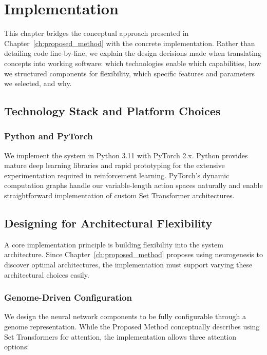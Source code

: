 \chapter{Implementation}
\label{ch:implementation}

This chapter bridges the conceptual approach presented in Chapter~\ref{ch:proposed_method} with the concrete implementation. Rather than detailing code line-by-line, we explain the design decisions made when translating concepts into working software: which technologies enable which capabilities, how we structured components for flexibility, which specific features and parameters we selected, and why.

\section{Technology Stack and Platform Choices}

\subsection{Python and PyTorch}

We implement the system in Python 3.11 with PyTorch 2.x. Python provides mature deep learning libraries and rapid prototyping for the extensive experimentation required in reinforcement learning. PyTorch's dynamic computation graphs handle our variable-length action spaces naturally and enable straightforward implementation of custom Set Transformer architectures.

\section{Designing for Architectural Flexibility}

A core implementation principle is building flexibility into the system architecture. Since Chapter~\ref{ch:proposed_method} proposes using neurogenesis to discover optimal architectures, the implementation must support varying these architectural choices easily.

\subsection{Genome-Driven Configuration}

We design the neural network components to be fully configurable through a genome representation. While the Proposed Method conceptually describes using Set Transformers for attention, the implementation allows three attention options:

